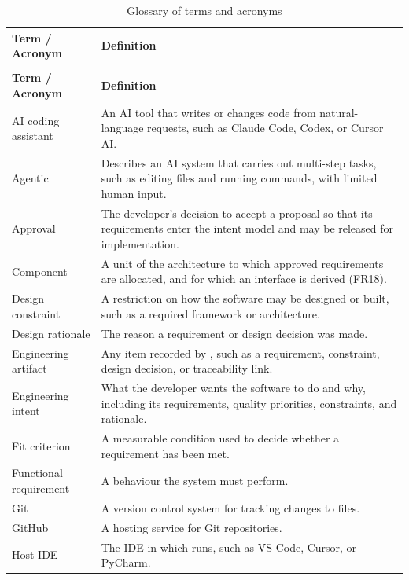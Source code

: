 \documentclass[12pt]{article}
\begin{document}
{\renewcommand{\arraystretch}{1.3}\setlength{\tabcolsep}{5pt}
\begin{longtable}{|>{\raggedright\arraybackslash}p{3.4cm}|p{8.9cm}|}
\caption{Glossary of terms and acronyms}\label{tab:glossary}\\
\hline
\textbf{Term / Acronym} & \textbf{Definition}\\
\hline
\endfirsthead
\multicolumn{2}{c}{\tablename\ \thetable\ -- Continued}\\
\hline
\textbf{Term / Acronym} & \textbf{Definition}\\
\hline
\endhead
AI coding assistant & An AI tool that writes or changes code from natural-language requests, such as Claude Code, Codex, or Cursor AI.\\ \hline
Agentic & Describes an AI system that carries out multi-step tasks, such as editing files and running commands, with limited human input.\\ \hline
Approval & The developer's decision to accept a proposal so that its requirements enter the intent model and may be released for implementation.\\ \hline
Component & A unit of the architecture to which approved requirements are allocated, and for which an interface is derived (FR18).\\ \hline
Design constraint & A restriction on how the software may be designed or built, such as a required framework or architecture.\\ \hline
Design rationale & The reason a requirement or design decision was made.\\ \hline
Engineering artifact & Any item recorded by \progname{}, such as a requirement, constraint, design decision, or traceability link.\\ \hline
Engineering intent & What the developer wants the software to do and why, including its requirements, quality priorities, constraints, and rationale.\\ \hline
Fit criterion & A measurable condition used to decide whether a requirement has been met.\\ \hline
Functional requirement & A behaviour the system must perform.\\ \hline
Git & A version control system for tracking changes to files.\\ \hline
GitHub & A hosting service for Git repositories.\\ \hline
Host IDE & The IDE in which \progname{} runs, such as VS Code, Cursor, or PyCharm.\\ \hline

\end{longtable}}
\end{document}
